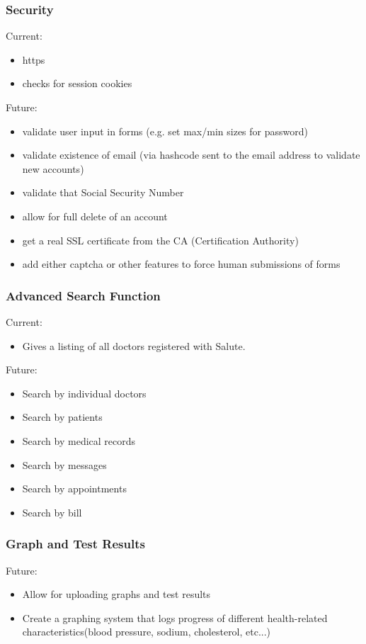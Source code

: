\documentclass[10pt]{report}
\begin{document}
\subsubsection{Security}
Current:
\begin{itemize}
\item https
\item checks for session cookies
\end{itemize}
Future: 
\begin{itemize}
\item validate user input in forms (e.g. set max/min sizes for password)
\item validate existence of email (via hashcode sent to the email address to validate new accounts)
\item validate that Social Security Number
\item allow for full delete of an account
\item get a real SSL certificate from the CA (Certification Authority)
\item add either captcha or other features to force human submissions of forms
\end{itemize}

\subsubsection{Advanced Search Function}
Current:
\begin{itemize}
\item Gives a listing of all doctors registered with Salute.
\end{itemize}
Future: 
\begin{itemize}
\item Search by individual doctors 
\item Search by patients
\item Search by medical records 
\item Search by messages
\item Search by appointments
\item Search by bill
\end{itemize}

\subsubsection{Graph and Test Results}
Future: 
\begin{itemize}
\item Allow for uploading graphs and test results
\item Create a graphing system that logs progress of different health-related characteristics(blood pressure, sodium, cholesterol, etc...)
\end{itemize}
\end{document}

